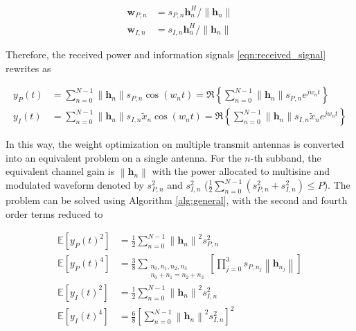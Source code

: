 \begin{align}\label{eqn:mrt_weights}
  {{\mathbf{w}}_{P,n}} &= {s_{P,n}}{\mathbf{h}}_n^H/\left\| {{{\mathbf{h}}_n}} \right\| \\
  {{\mathbf{w}}_{I,n}} &= {s_{I,n}}{\mathbf{h}}_n^H/\left\| {{{\mathbf{h}}_n}} \right\|
\end{align}

Therefore, the received power and information signals \eqref{eqn:received_signal} rewrites as

\begin{align}\label{eqn:mrt_received_components}
  {y_P}(t) &= \sum\limits_{n = 0}^{N - 1} {\left\| {{{\mathbf{h}}_n}} \right\|} {s_{P,n}}\cos \left( {{w_n}t} \right) = \Re \left\{ {\sum\limits_{n = 0}^{N - 1} {\left\| {{{\mathbf{h}}_n}} \right\|} {s_{P,n}}{e^{j{w_n}t}}} \right\} \\
  {y_I}(t) &= \sum\limits_{n = 0}^{N - 1} {\left\| {{{\mathbf{h}}_n}} \right\|} {s_{I,n}}{{\tilde x}_n}\cos \left( {{w_n}t} \right) = \Re \left\{ {\sum\limits_{n = 0}^{N - 1} {\left\| {{{\mathbf{h}}_n}} \right\|} {s_{I,n}}{{\tilde x}_n}{e^{j{w_n}t}}} \right\}
\end{align}

In this way, the weight optimization on multiple transmit antennas is converted into an equivalent problem on a single antenna. For the $n$-th subband, the equivalent channel gain is $\left\| {{{\mathbf{h}}_n}} \right\|$ with the power allocated to multisine and modulated waveform denoted by $s_{P,n}^2$ and $s_{I,n}^2$ ($\frac{1}{2}\sum\nolimits_{n = 0}^{N - 1} {\left( {s_{P,n}^2 + s_{I,n}^2} \right)}  \leqslant P$). The problem can be solved using Algorithm \ref{alg:general}, with the second and fourth order terms reduced to

\begin{align}\label{eqn:decoupled_terms}
  \mathbb{E}\left[ {{y_P}{{(t)}^2}} \right] &= \frac{1}{2}\sum\limits_{n = 0}^{N - 1} {{{\left\| {{{\mathbf{h}}_n}} \right\|}^2}} s_{P,n}^2 \\
  \mathbb{E}\left[ {{y_P}{{(t)}^4}} \right] &= \frac{3}{8}\sum\limits_{\substack{ {n_0},{n_1},{n_2},{n_3} \\ {n_0} + {n_1} = {n_2} + {n_3} }}  {\left[ {\prod\limits_{j = 0}^3 {{s_{P,{n_j}}}} \left\| {{{\mathbf{h}}_{{n_j}}}} \right\|} \right]}  \\
  \mathbb{E}\left[ {{y_I}{{(t)}^2}} \right] &= \frac{1}{2}\sum\limits_{n = 0}^{N - 1} {{{\left\| {{{\mathbf{h}}_n}} \right\|}^2}} s_{I,n}^2 \\
  \mathbb{E}\left[ {{y_I}{{(t)}^4}} \right] &= \frac{6}{8}{\left[ {\sum\limits_{n = 0}^{N - 1} {{{\left\| {{{\mathbf{h}}_n}} \right\|}^2}} s_{I,n}^2} \right]^2}
\end{align}

